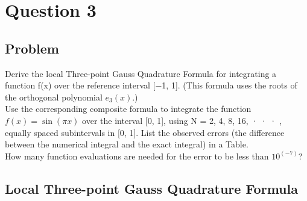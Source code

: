 \section{Question 3}
\subsection{Problem}
Derive the local Three-point Gauss Quadrature Formula for integrating a function f(x) over
the reference interval [−1, 1]. (This formula uses the roots of the orthogonal polynomial
$e_{3}(x)$.) \\
Use the corresponding composite formula to integrate the function $f(x) = \sin (\pi x)$ over the interval [0, 1], using N = 2, 4, 8, 16, · · · , equally spaced subintervals in [0, 1]. List the observed errors (the difference between the numerical integral and the exact integral) in a Table. \\
How many function evaluations are needed for the error to be less than $10^(−7)$? \\

\subsection{Local Three-point Gauss Quadrature Formula}


